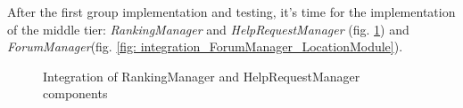 \documentclass[table, 12pt]{article}
\begin{document}
After the first group implementation and testing, it's time for the implementation of the middle tier: \emph{RankingManager} and \emph{HelpRequestManager} (fig. \ref{fig: integration_RankingManager_HelpRequestManager}) and \emph{ForumManager}(fig. \ref{fig: integration_ForumManager_LocationModule}).
\begin{figure}[H]
    \centering
    \qquad\qquad
    \caption{Integration of RankingManager and HelpRequestManager components}%
    \label{fig: integration_RankingManager_HelpRequestManager}%
\end{figure}
\end{document}

